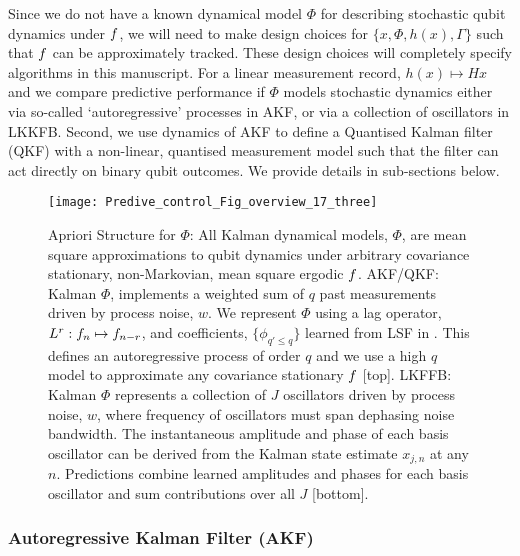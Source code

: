  Since we do not have a known dynamical model $\Phi$ for describing stochastic qubit dynamics under $f$, we will need to make design choices for  $\{ x, \Phi, h(x), \Gamma \}$  such that $f$ can be approximately tracked. These design choices will completely specify algorithms in this manuscript. For a linear measurement record,   $h(x) \mapsto Hx$ and we compare predictive performance if $\Phi$ models stochastic dynamics either via so-called `autoregressive' processes in AKF, or via a collection of oscillators in LKKFB. Second, we use dynamics of AKF to define a Quantised Kalman filter (QKF) with a non-linear, quantised measurement model such that the filter can act directly on binary qubit outcomes. We provide details in sub-sections below. 
 
\begin{figure} [h]
    \texttt{[image: Predive\_control\_Fig\_overview\_17\_three]}
    \caption{\label{Predive_control_Fig_overview_17_three} Apriori Structure for $\Phi$: All Kalman dynamical models, $\Phi$, are mean square approximations to qubit dynamics under arbitrary covariance stationary, non-Markovian, mean square ergodic $f$. AKF/QKF: Kalman $\Phi$, implements a weighted sum of $q$ past measurements driven by process noise, $w$. We represent $\Phi$ using a lag operator, $L^r: f_n \mapsto f_{n-r}$, and coefficients, $ \{ \phi_{q' \leq q} \}$ learned from LSF in \cite{mavadia2017}. This defines an autoregressive process of order $q$ and we use a high $q$ model to approximate any covariance stationary $f$ [top]. LKFFB: Kalman $\Phi$ represents a collection of $J$ oscillators driven by process noise, $w$, where frequency of oscillators must span dephasing noise bandwidth. The instantaneous amplitude and phase of each basis oscillator can be derived from the Kalman state estimate $x_{j, n}$ at any $n$. Predictions combine learned amplitudes and phases for each basis oscillator and sum contributions over all $J$ [bottom].}
\end{figure}

\subsubsection{Autoregressive Kalman Filter (AKF)}

